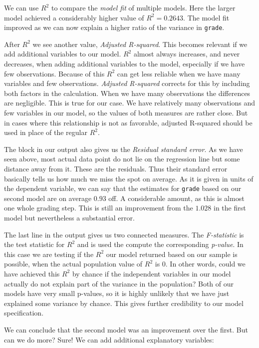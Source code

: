 \documentclass[
]{book}
\begin{document}
We can use \(R^2\) to compare the \emph{model fit} of multiple models. Here the larger
model achieved a considerably higher value of \(R^2 = 0.2643\). The model fit
improved as we can now explain a higher ratio of the variance in \texttt{grade}.

After \(R^2\) we see another value, \emph{Adjusted R-squared}. This becomes relevant
if we add additional variables to our model. \(R^2\) almost always increases, and
never decreases, when adding additional variables to the model,
especially if we have few observations. Because of this \(R^2\) can get less
reliable when we have many variables and few observations. \emph{Adjusted R-squared}
corrects for this by including both factors in the calculation. When we have
many observations the differences are negligible. This is true for our case.
We have relatively many observations and few variables in our model, so the
values of both measures are rather close. But in cases where this relationship
is not as favorable, adjusted R-squared should be used in place of the regular
\(R^2\).

The block in our output also gives us the \emph{Residual standard error}. As we have
seen above, most actual data point do not lie on the regression line but some
distance away from it. These are the residuals. Thus their standard error basically
tells us how much we miss the spot on average. As it is given in units of the
dependent variable, we can say that the estimates for \texttt{grade} based on our
second model are on average \(0.93\) off. A considerable amount, as this is almost
one whole grading step. This is still an improvement from the \(1.028\) in the
first model but nevertheless a substantial error.

The last line in the output gives us two connected measures. The \emph{F-statistic}
is the test statistic for \(R^2\) and is used the compute the corresponding
\emph{p-value}.
In this case we are testing if the \(R^2\) our model returned based on our sample
is possible, when the actual population value of \(R^2\) is \(0\). In other words,
could we have achieved this \(R^2\) by chance if the independent variables in our
model actually do not explain part of the variance in the population?
Both of our models have very small p-values, so it is highly unlikely that we
have just explained some variance by chance. This gives further credibility to
our model specification.

We can conclude that the second model was an improvement over the first. But can
we do more? Sure! We can add additional explanatory variables:
\end{document}
